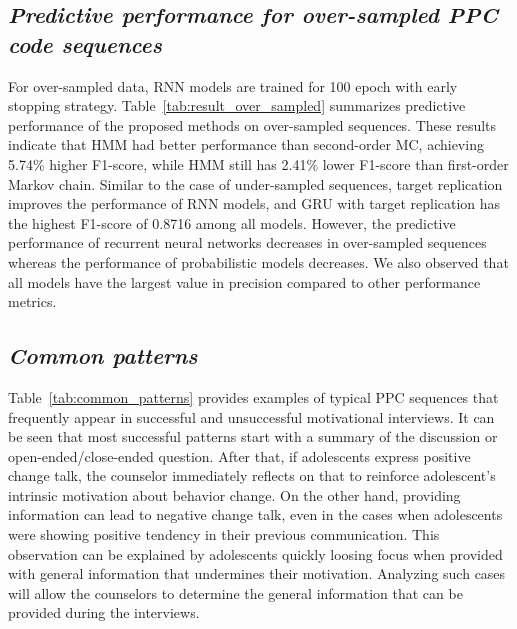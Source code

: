 \documentclass{amia_summit_2018}
\begin{document}
\subsection*{\textit{Predictive performance for over-sampled PPC code sequences}}
For over-sampled data, RNN models are trained for 100 epoch with early stopping strategy. Table~\ref{tab:result_over_sampled} summarizes predictive performance of the proposed methods on over-sampled sequences. These results indicate that HMM had better performance than second-order MC, achieving 5.74\% higher F1-score, while HMM still has 2.41\% lower F1-score than first-order Markov chain. Similar to the case of under-sampled sequences, target replication improves the performance of RNN models, and GRU with target replication has the highest F1-score of 0.8716 among all models. However, the predictive performance of recurrent neural networks decreases in over-sampled sequences whereas the performance of probabilistic models decreases. We also observed that all models have the largest value in precision compared to other performance metrics.

\subsection*{\textit{Common patterns}}
Table~\ref{tab:common_patterns} provides examples of typical PPC sequences that frequently appear in successful and unsuccessful motivational interviews. It can be seen that most successful patterns start with a summary of the discussion or open-ended/close-ended question. After that, if adolescents express positive change talk, the counselor immediately reflects on that to reinforce adolescent's intrinsic motivation about behavior change. On the other hand, providing information can lead to negative change talk, even in the cases when adolescents were showing positive tendency in their previous communication. This observation can be explained by adolescents quickly loosing focus when provided with general information that undermines their motivation. Analyzing such cases will allow the counselors to determine the general information that can be provided during the interviews. \\
\end{document}
